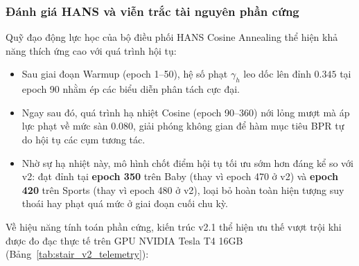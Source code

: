 \subsubsection{Đánh giá HANS và viễn trắc tài nguyên phần cứng}

Quỹ đạo động lực học của bộ điều phối HANS Cosine Annealing thể hiện khả năng thích ứng cao với quá trình hội tụ:
\begin{itemize}[leftmargin=*]
    \item Sau giai đoạn Warmup (epoch 1--50), hệ số phạt $\gamma_h$ leo dốc lên đỉnh $0.345$ tại epoch 90 nhằm ép các biểu diễn phân tách cực đại.
    \item Ngay sau đó, quá trình hạ nhiệt Cosine (epoch 90--360) nới lỏng mượt mà áp lực phạt về mức sàn $0.080$, giải phóng không gian để hàm mục tiêu BPR tự do hội tụ các cụm tương tác.
    \item Nhờ sự hạ nhiệt này, mô hình chốt điểm hội tụ tối ưu sớm hơn đáng kể so với v2: đạt đỉnh tại \textbf{epoch 350} trên Baby (thay vì epoch 470 ở v2) và \textbf{epoch 420} trên Sports (thay vì epoch 480 ở v2), loại bỏ hoàn toàn hiện tượng suy thoái hay phạt quá mức ở giai đoạn cuối chu kỳ.
\end{itemize}

Về hiệu năng tính toán phần cứng, kiến trúc v2.1 thể hiện ưu thế vượt trội khi được đo đạc thực tế trên GPU NVIDIA Tesla T4 16GB (Bảng~\ref{tab:stair_v2_telemetry}):

